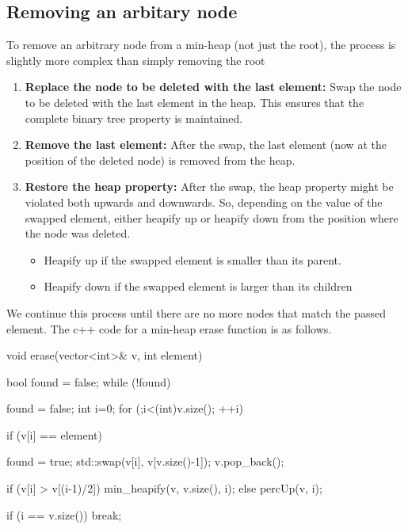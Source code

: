 \documentclass{report}
\begin{document}
\subsection{Removing an arbitary node}
\bigbreak \noindent 
To remove an arbitrary node from a min-heap (not just the root), the process is slightly more complex than simply removing the root
\bigbreak \noindent 
\begin{enumerate}
    \item \textbf{Replace the node to be deleted with the last element:} Swap the node to be deleted with the last element in the heap. This ensures that the complete binary tree property is maintained.
    \item \textbf{Remove the last element:} After the swap, the last element (now at the position of the deleted node) is removed from the heap.
    \item \textbf{Restore the heap property:} After the swap, the heap property might be violated both upwards and downwards. So, depending on the value of the swapped element, either heapify up or heapify down from the position where the node was deleted.
        \begin{itemize}
            \item Heapify up if the swapped element is smaller than its parent.
            \item Heapify down if the swapped element is larger than its children
        \end{itemize}
\end{enumerate}
\bigbreak \noindent 
We continue this process until there are no more nodes that match the passed element. The c++ code for a min-heap erase function is as follows.
\bigbreak \noindent 
\begin{cppcode}
    void erase(vector<int>& v, int element) {
        bool found = false;
        while (!found) {
            found = false;
            int i=0;
            for (;i<(int)v.size(); ++i) {
                if (v[i] == element) {
                    found = true;
                    std::swap(v[i], v[v.size()-1]);
                    v.pop_back();

                    if (v[i] > v[(i-1)/2]) {
                        min_heapify(v, v.size(), i);
                    } else {
                        percUp(v, i);
                    }
                }
            }
            if (i == v.size()) break;
        }
    }
\end{cppcode}
\end{document}
